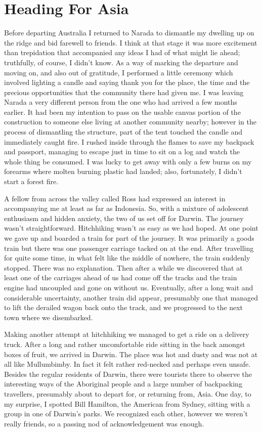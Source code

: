 \chapter{Heading For Asia}

Before departing Australia I returned to Narada to dismantle my dwelling
up on the ridge and bid farewell to friends. I think at that stage it
was more excitement than trepidation that accompanied any ideas I had of
what might lie ahead; truthfully, of course, I didn't know. As a way of
marking the departure and moving on, and also out of gratitude, I
performed a little ceremony which involved lighting a candle and saying
thank you for the place, the time and the precious opportunities that
the community there had given me. I was leaving Narada a very different
person from the one who had arrived a few months earlier. It had been my
intention to pass on the usable canvas portion of the construction to
someone else living at another community nearby; however in the process
of dismantling the structure, part of the tent touched the candle and
immediately caught fire. I rushed inside through the flames to save my
backpack and passport, managing to escape just in time to sit on a log
and watch the whole thing be consumed. I was lucky to get away with only
a few burns on my forearms where molten burning plastic had landed;
also, fortunately, I didn't start a forest fire.

A fellow from across the valley called Ross had expressed an interest in
accompanying me at least as far as Indonesia. So, with a mixture of
adolescent enthusiasm and hidden anxiety, the two of us set off for
Darwin. The journey wasn't straightforward. Hitchhiking wasn't as easy
as we had hoped. At one point we gave up and boarded a train for part of
the journey. It was primarily a goods train but there was one passenger
carriage tacked on at the end. After travelling for quite some time, in
what felt like the middle of nowhere, the train suddenly stopped. There
was no explanation. Then after a while we discovered that at least one
of the carriages ahead of us had come off the tracks and the train
engine had uncoupled and gone on without us. Eventually, after a long
wait and considerable uncertainty, another train did appear, presumably
one that managed to lift the derailed wagon back onto the track, and we
progressed to the next town where we disembarked.

Making another attempt at hitchhiking we managed to get a ride on a
delivery truck. After a long and rather uncomfortable ride sitting in
the back amongst boxes of fruit, we arrived in Darwin. The place was hot
and dusty and was not at all like Mullumbimby. In fact it felt rather
red-necked and perhaps even unsafe. Besides the regular residents of
Darwin, there were tourists there to observe the interesting ways of the
Aboriginal people and a large number of backpacking travellers,
presumably about to depart for, or returning from, Asia. One day, to my
surprise, I spotted Bill Hamilton, the American from Sydney, sitting
with a group in one of Darwin's parks. We recognized each other, however
we weren't really friends, so a passing nod of acknowledgement was
enough.

